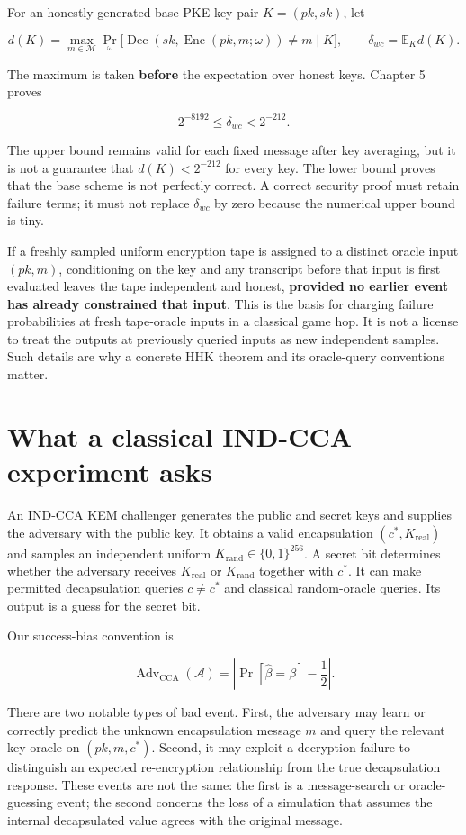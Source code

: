 \documentclass[
  11pt,
  a4paper,
  oneside]{report}
\begin{document}
For an honestly generated base PKE key pair \(K=(pk,sk)\), let

\[
d(K)=\max_{m\in\mathcal M}\Pr_\omega\bigl[
\operatorname{Dec}(sk,\operatorname{Enc}(pk,m;\omega))\ne m\mid K\bigr],
\qquad
\delta_{wc}=\mathbb E_K d(K).
\]

The maximum is taken \textbf{before} the expectation over honest keys.
Chapter 5 proves

\[
\boxed{2^{-8192}\le\delta_{wc}<2^{-212}.}
\]

The upper bound remains valid for each fixed message after key
averaging, but it is not a guarantee that \(d(K)<2^{-212}\) for every
key. The lower bound proves that the base scheme is not perfectly
correct. A correct security proof must retain failure terms; it must not
replace \(\delta_{wc}\) by zero because the numerical upper bound is
tiny.

If a freshly sampled uniform encryption tape is assigned to a distinct
oracle input \((pk,m)\), conditioning on the key and any transcript
before that input is first evaluated leaves the tape independent and
honest, \textbf{provided no earlier event has already constrained that
input}. This is the basis for charging failure probabilities at fresh
tape-oracle inputs in a classical game hop. It is not a license to treat
the outputs at previously queried inputs as new independent samples.
Such details are why a concrete HHK theorem and its oracle-query
conventions matter.

\section{What a classical IND-CCA experiment
asks}\label{what-a-classical-ind-cca-experiment-asks}

An IND-CCA KEM challenger generates the public and secret keys and
supplies the adversary with the public key. It obtains a valid
encapsulation \((c^*,K_{\mathrm{real}})\) and samples an independent
uniform \(K_{\mathrm{rand}}\in\{0,1\}^{256}\). A secret bit determines
whether the adversary receives \(K_{\mathrm{real}}\) or
\(K_{\mathrm{rand}}\) together with \(c^*\). It can make permitted
decapsulation queries \(c\ne c^*\) and classical random-oracle queries.
Its output is a guess for the secret bit.

Our success-bias convention is

\[
\operatorname{Adv}_{\mathrm{CCA}}(\mathcal A)
=\left|\Pr[\widehat\beta=\beta]-\frac12\right|.
\]

There are two notable types of bad event. First, the adversary may learn
or correctly predict the unknown encapsulation message \(m\) and query
the relevant key oracle on \((pk,m,c^*)\). Second, it may exploit a
decryption failure to distinguish an expected re-encryption relationship
from the true decapsulation response. These events are not the same: the
first is a message-search or oracle-guessing event; the second concerns
the loss of a simulation that assumes the internal decapsulated value
agrees with the original message.
\end{document}
